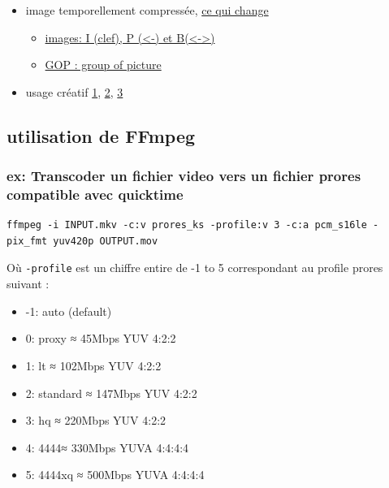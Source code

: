 \documentclass[
]{book}
\providecommand{\tightlist}{%
  \setlength{\itemsep}{0pt}\setlength{\parskip}{0pt}}
\begin{document}
\begin{itemize}
\tightlist
\item
  image temporellement compressée, \href{http://dvd-hq.info/data_compression_3.php}{ce qui change}

  \begin{itemize}
  \tightlist
  \item
    \href{https://en.wikipedia.org/wiki/Video_compression_picture_types}{images: I (clef), P (\textless-) et B(\textless-\textgreater)}
  \item
    \href{https://en.wikipedia.org/wiki/Inter_frame\#/media/File:IPB_images_sequence.png}{GOP : group of picture}
  \end{itemize}
\item
  usage créatif \href{https://www.youtube.com/watch?v=rMSsw4CZvKg}{1}, \href{https://www.youtube.com/watch?v=rSmEOk5AiN0}{2}, \href{https://www.youtube.com/watch?v=dNa0-xrKi3Q}{3}
\end{itemize}

\hypertarget{utilisation-de-ffmpeg}{%
\subsection{utilisation de FFmpeg}\label{utilisation-de-ffmpeg}}

\hypertarget{ex-transcoder-un-fichier-video-vers-un-fichier-prores-compatible-avec-quicktime}{%
\subsubsection{ex: Transcoder un fichier video vers un fichier prores compatible avec quicktime}\label{ex-transcoder-un-fichier-video-vers-un-fichier-prores-compatible-avec-quicktime}}

\begin{verbatim}
ffmpeg -i INPUT.mkv -c:v prores_ks -profile:v 3 -c:a pcm_s16le -pix_fmt yuv420p OUTPUT.mov
\end{verbatim}

Où \texttt{-profile} est un chiffre entire de -1 to 5 correspondant au profile prores suivant :

\begin{itemize}
\tightlist
\item
  -1: auto (default)
\item
  0: proxy ≈ 45Mbps YUV 4:2:2
\item
  1: lt ≈ 102Mbps YUV 4:2:2
\item
  2: standard ≈ 147Mbps YUV 4:2:2
\item
  3: hq ≈ 220Mbps YUV 4:2:2
\item
  4: 4444≈ 330Mbps YUVA 4:4:4:4
\item
  5: 4444xq ≈ 500Mbps YUVA 4:4:4:4
\end{itemize}
\end{document}
